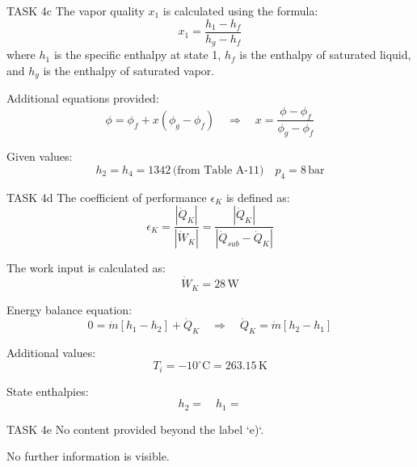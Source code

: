 TASK 4c  
The vapor quality \( x_1 \) is calculated using the formula:  
\[
x_1 = \frac{h_1 - h_f}{h_g - h_f}
\]  
where \( h_1 \) is the specific enthalpy at state 1, \( h_f \) is the enthalpy of saturated liquid, and \( h_g \) is the enthalpy of saturated vapor.  

Additional equations provided:  
\[
\phi = \phi_f + x (\phi_g - \phi_f) \quad \Rightarrow \quad x = \frac{\phi - \phi_f}{\phi_g - \phi_f}
\]  

Given values:  
\[
h_2 = h_4 = 1342 \, \text{(from Table A-11)} \quad p_4 = 8 \, \text{bar}
\]  

TASK 4d  
The coefficient of performance \( \epsilon_K \) is defined as:  
\[
\epsilon_K = \frac{|\dot{Q}_K|}{|\dot{W}_K|} = \frac{|\dot{Q}_K|}{|\dot{Q}_{sub} - \dot{Q}_K|}
\]  

The work input is calculated as:  
\[
\dot{W}_K = 28 \, \text{W}
\]  

Energy balance equation:  
\[
0 = \dot{m} [h_1 - h_2] + \dot{Q}_K \quad \Rightarrow \quad \dot{Q}_K = \dot{m} [h_2 - h_1]
\]  

Additional values:  
\[
T_i = -10^\circ\text{C} = 263.15 \, \text{K}
\]  

State enthalpies:  
\[
h_2 = \quad h_1 =
\]  

TASK 4e  
No content provided beyond the label `e)`.  

No further information is visible.